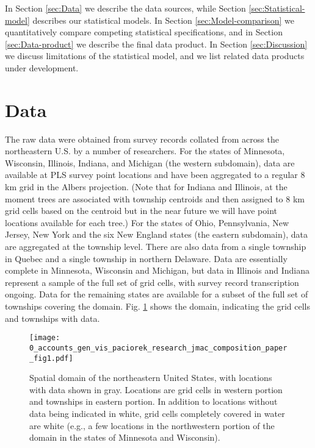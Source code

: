 \documentclass[12pt]{article}\usepackage[]{graphicx}\usepackage[]{color}
\begin{document}
In Section \ref{sec:Data} we describe the data sources, while Section
\ref{sec:Statistical-model} describes our statistical models. In
Section \ref{sec:Model-comparison} we quantitatively compare competing
statistical specifications, and in Section \ref{sec:Data-product}
we describe the final data product. In Section \ref{sec:Discussion}
we discuss limitations of the statistical model, and we list related
data products under development.




\section{Data\label{sec:Data}}

The raw data were obtained from survey records collated from across
the northeastern U.S. by a number of researchers. For the states of
Minnesota, Wisconsin, Illinois, Indiana, and Michigan (the western
subdomain), data are available at PLS survey point locations and have
been aggregated to a regular 8 km grid in the Albers projection. (Note
that for Indiana and Illinois, at the moment trees are associated
with township centroids and then assigned to 8 km grid cells based
on the centroid but in the near future we will have point locations
available for each tree.) For the states of Ohio, Pennsylvania, New
Jersey, New York and the six New England states (the eastern subdomain),
data are aggregated at the township level. There are also data from
a single township in Quebec and a single township in northern Delaware.
Data are essentially complete in Minnesota, Wisconsin and Michigan,
but data in Illinois and Indiana represent a sample of the full set
of grid cells, with survey record transcription ongoing. Data for
the remaining states are available for a subset of the full set of
townships covering the domain. Fig. \ref{fig:Spatial-domain} shows
the domain, indicating the grid cells and townships with data.

\begin{figure}
\label{fig:domain}\texttt{[image: 0\_accounts\_gen\_vis\_paciorek\_research\_jmac\_composition\_paper\_fig1.pdf]}

\caption{Spatial domain of the northeastern United States, with locations with
data shown in gray. Locations are grid cells in western portion and
townships in eastern portion. In addition to locations without data
being indicated in white, grid cells completely covered in water are
white (e.g., a few locations in the northwestern portion of the domain
in the states of Minnesota and Wisconsin).\label{fig:Spatial-domain}}
\end{figure}
\end{document}
